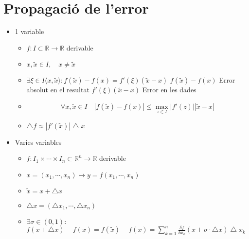 \documentclass[a4paper,10pt]{article}
\newcommand{\blue}[1]{{\color{blue}#1}}
\newcommand{\R}{\mathbb{R}}
\begin{document}
\section{Propagació de l'error}
\begin{itemize}
\item 1 variable
	\begin{itemize}
	\item $f: I \subset \R \to \R$ \blue{derivable}
	\item $x, \tilde{x} \in I,\quad x \neq \tilde{x}$
	\item $\exists \xi \in I \langle x, \tilde{x}\rangle: f(\tilde{x}) - f(x) = f'(\xi)(\tilde{x} - x)$
		\subitem $f(\tilde{x}) - f(x)$ \blue{Error absolut en el resultat}
		\subitem $f'(\xi)(\tilde{x} - x)$ \blue{Error en les dades}
	\item $$\forall x, \tilde{x} \in I\quad |f(\tilde{x}) - f(x)| \le \max_{z \in I}|f'(z)||\tilde{x} - x|$$
	\item $\bigtriangleup f \approx |f'(\tilde{x})| \bigtriangleup x$
	\end{itemize}
\item Varies variables
	\begin{itemize}
	\item $f: I_1 \times \cdots \times I_n \subset \R^n \to \R$ derivable
	\item $x = (x_1, \cdots, x_n) \mapsto y = f (x_1, \cdots, x_n)$
	\item $\tilde{x} = x + \bigtriangleup x$
	\item $\bigtriangleup x = (\bigtriangleup x_1, \cdots, \bigtriangleup x_n)$
	\item $\exists \sigma \in (0, 1):$
		\subitem $f(x + \bigtriangleup x) - f(x) = f(\tilde{x}) - f(x) = \sum_{k=1}^n \frac{\delta f}{\delta x_k}(x + \sigma\cdot \bigtriangleup x) \bigtriangleup x_k$
	\end{itemize}
\end{itemize}
\end{document}
